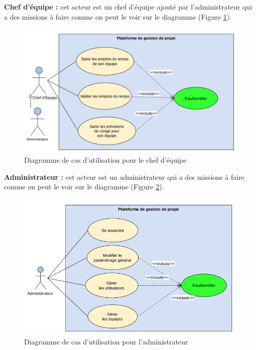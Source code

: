 \newpage
\par \textbf{	Chef d’équipe :} cet acteur est un chef d’équipe ajouté par l'administrateur qui a des missions à faire comme on peut le voir sur le diagramme (Figure \ref{fig:cas_chefe}).
\begin{figure}[h]
    \centering
    \includegraphics[scale=0.8]{figures/anis7.png}
    \caption{Diagramme de cas d’utilisation pour le chef d’équipe}
    \label{fig:cas_chefe}
\end{figure}

\par \textbf{ Administrateur :} cet acteur est un administrateur qui a des missions à faire comme on peut le voir sur le diagramme (Figure \ref{fig:cas_admin}).
\begin{figure}[h]
    \centering
    \includegraphics[scale=0.53]{figures/3333anis1.png}
    \caption{Diagramme de cas d’utilisation pour l’administrateur}
    \label{fig:cas_admin}
\end{figure}\newpage
